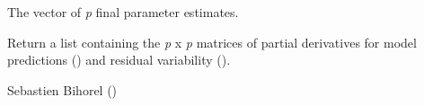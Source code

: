 \begin{Arguments}
\begin{ldescription}
\begin{description}
\end{description}


\item[\code{x}] The vector of \emph{p} final parameter estimates.
\end{ldescription}
\end{Arguments}
%
\begin{Value}
Return a list containing the \emph{p} x \emph{p} matrices of partial
derivatives for model predictions () and residual variability
().
\end{Value}
%
\begin{Author}\relax
Sebastien Bihorel ()
\end{Author}
%
\begin{SeeAlso}\relax
{}
\end{SeeAlso}

